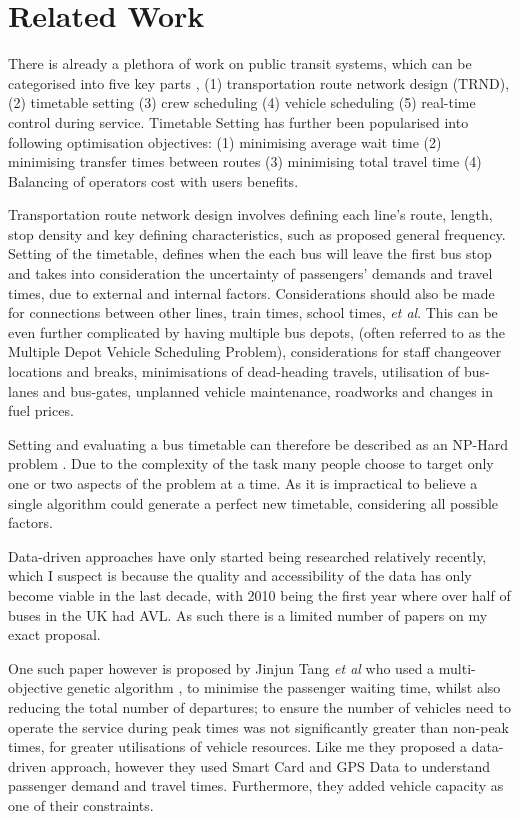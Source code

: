 \documentclass{article}
\begin{document}
\section{Related Work}
There is already a plethora of work on public transit systems, which can be categorised into five key parts \cite{RN18} \cite{RN20}, (1) transportation route network design (TRND), (2) timetable setting (3) crew scheduling (4) vehicle scheduling (5) real-time control during service. Timetable Setting has further been popularised into following optimisation objectives\cite{RN7}: (1) minimising average wait time (2) minimising transfer times between routes (3) minimising total travel time (4) Balancing of operators cost with users benefits. 

 \par
Transportation route network design involves defining each line's route, length, stop density and key defining characteristics, such as proposed general frequency. Setting of the timetable, defines when the each bus will leave the first bus stop and takes into consideration the uncertainty of passengers' demands and travel times, due to external and internal factors\cite{RN11}. Considerations should also be made for connections between other lines, train times, school times, \textsl{et al}. This can be even further complicated by having multiple bus depots, (often referred to as the Multiple Depot Vehicle Scheduling Problem), considerations for staff changeover locations and breaks, minimisations of dead-heading travels, utilisation of bus-lanes and bus-gates, unplanned vehicle maintenance, roadworks and changes in fuel prices. 

\par 
Setting and evaluating a bus timetable can therefore be described as an NP-Hard problem \cite{RN15}. Due to the complexity of the task many people choose to target only one or two aspects of the problem at a time. As it is impractical to believe a single algorithm could generate a perfect new timetable, considering all possible factors.

\par
Data-driven approaches have only started being researched relatively recently, which I suspect is because the quality and accessibility of the data has only become viable in the last decade, with 2010 being the first year where over half of buses in the UK had AVL\cite{RN12}. As such there is a limited number of papers on my exact proposal.

\par
 One such paper however is proposed by Jinjun Tang \textsl{et al} who used a multi-objective genetic algorithm \cite{RN18}, to minimise the passenger waiting time, whilst also reducing the total number of departures; to ensure the number of vehicles need to operate the service during peak times was not significantly greater than non-peak times, for greater utilisations of vehicle resources. Like me they proposed a data-driven approach, however they used Smart Card and GPS Data to understand passenger demand and travel times. Furthermore, they added vehicle capacity as one of their constraints.
\end{document}
